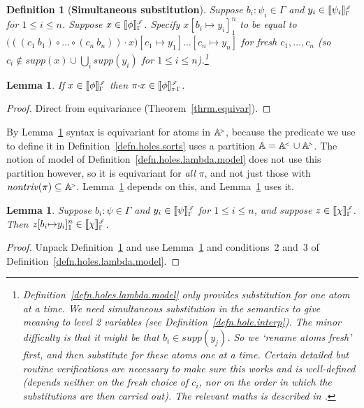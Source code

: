 \documentclass[submission,copyright]{eptcs}
\newtheorem{lemm}[thrm]{Lemma}
\newtheorem{defn}[thrm]{Definition}
\newcommand{\f}[1]{\ensuremath{\text{$\mathit{#1}$}}}
\newcommand{\sm}{\mapsto}
\newcommand{\supp}{\f{supp}}
\newcommand\nontriv{\f{nontriv}}
\newcommand\den[1]{{\hspace{.00ex}\scalebox{.55}{$#1$}}}
\newcommand{\idenot}[2]{\denot{\interp I}{#1}{#2}}
\newcommand\interp[1]{\ensuremath{\mathscr #1}}
\newcommand{\denot}[3]{\llbracket #3 \rrbracket_{\scalebox{.6}{$#2$}}^\den{#1}} \newcommand{\hdenot}[1]{\denot{\interp H}{}{#1}}
\newcommand{\act}{{\cdot}}
\newcommand\atomsdown{\mathbb A^{\hspace{-.3ex}{}_{{}^<}}}
\newcommand\atomsup{\mathbb A^{\hspace{-.3ex}{}_{{}^>}\!}} \newcommand\basesort{\tau}
\begin{document}
\begin{defn}[\bf Simultaneous substitution]
\label{defn.sim.sub}
Suppose $b_i{:}\psi_i\in\Gamma$ and $y_i\in\idenot{\Gamma}{\psi_i}$ for $1{\leq}i{\leq}n$.
Suppose $x\in\idenot{\Gamma}{\phi}$.
Specify $x[b_i{\sm}y_i]_1^n$ to be equal to 
$\bigl(((c_1\ b_1)\circ\dots\circ(c_n\ b_n))\act x\bigr)[c_1{\sm}y_1]\dots[c_n{\sm}y_n]$
for fresh $c_1,\dots,c_n$ (so $c_i\not\in\supp(x)\cup\bigcup_i\supp(y_i)$ for $1\leq i\leq n$).\footnote{Definition~\ref{defn.holes.lambda.model} only provides substitution for one atom at a time.  
We need simultaneous substitution in the semantics to give meaning to level 2 variables (see Definition~\ref{defn.hole.interp}).
The minor difficulty is that it might be that $b_i\in\supp(y_j)$.  
So we `rename atoms fresh' first, and then substitute for these atoms one at a time.
Certain detailed but routine verifications are necessary to make sure this works and is well-defined (depends neither on the fresh choice of $c_i$, nor on the order in which the substitutions are then carried out).
The relevant maths is described in \cite[Section~6]{gabbay:fountl}.}
\end{defn}

\begin{lemm}
\label{lemm.intype.equivar}
If $x\in\idenot{\Gamma}{\phi}$ then $\pi\act x\in\idenot{\pi\act\Gamma}{\phi}$.
\end{lemm}
\begin{proof}
Direct from equivariance (Theorem~\ref{thrm.equivar}).
\end{proof}

By Lemma~\ref{lemm.intype.equivar} syntax is equivariant for atoms in $\atomsup$, because the predicate we use to define it in Definition~\ref{defn.holes.sorts} uses a partition $\mathbb A=\atomsdown\cup\atomsup$.  
The notion of model of Definition~\ref{defn.holes.lambda.model} does not use this partition however, so it is equivariant for \emph{all} $\pi$, and not just those with $\nontriv(\pi)\subseteq\atomsup$.  
Lemma~\ref{lemm.intype.equivar} depends on this, and Lemma~\ref{lemm.holes.easy} uses it.


\begin{lemm}
\label{lemm.holes.easy}
Suppose $b_i{:}\psi\in\Gamma$ and $y_i\in\idenot{\Gamma}{\psi}$ for $1{\leq}i{\leq}n$, and suppose $z\in\idenot{\Gamma}{\chi}$.
Then $z[b_i{\sm} y_i]_1^n\in\idenot{\Gamma}{\chi}$.
\end{lemm}
\begin{proof}
Unpack Definition~\ref{defn.sim.sub} and use Lemma~\ref{lemm.intype.equivar} and conditions~2 and~3 of Definition~\ref{defn.holes.lambda.model}.
\end{proof}
\end{document}
